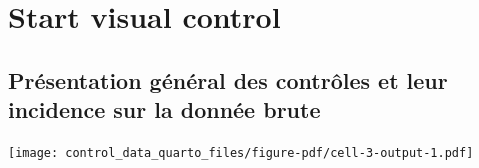 \documentclass[
  11pt,
]{article}
\renewcommand*\contentsname{Table des matières}
\newcommand\contentsname{Table des matières}
\begin{document}
\renewcommand*\contentsname{Table des matières}
{
\hypersetup{linkcolor=}
\setcounter{tocdepth}{4}
\tableofcontents
}
\section{Start visual control}\label{start-visual-control}

\subsection{Présentation général des contrôles et leur incidence sur la
donnée
brute}\label{pruxe9sentation-guxe9nuxe9ral-des-contruxf4les-et-leur-incidence-sur-la-donnuxe9e-brute}

\texttt{[image: control\_data\_quarto\_files/figure-pdf/cell-3-output-1.pdf]}
\end{document}
